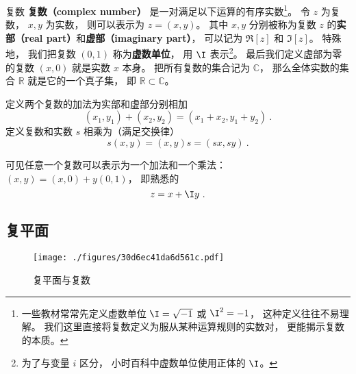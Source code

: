 


\begin{definition}{复数}
\textbf{复数（complex number）} 是一对满足以下运算的有序实数\footnote{一些教材常常先定义虚数单位 $\I = \sqrt{-1}$ 或 $\I^2 = -1$， 这种定义往往不易理解。 我们这里直接将复数定义为服从某种运算规则的实数对， 更能揭示复数的本质\cite{Rudin}。}。 令 $z$ 为复数， $x, y$ 为实数， 则可以表示为 $z = (x, y)$。 其中 $x,y$ 分别被称为复数 $z$ 的\textbf{实部（real part）}和\textbf{虚部（imaginary part）}， 可以记为 $\Re[z]$ 和 $\Im[z]$。 特殊地， 我们把复数 $(0, 1)$ 称为\textbf{虚数单位}， 用 $\I$ 表示\footnote{为了与变量 $i$ 区分， 小时百科中虚数单位使用正体的 $\I$。}。 最后我们定义虚部为零的复数 $(x, 0)$ 就是实数 $x$ 本身。 把所有复数的集合记为 $\mathbb C$， 那么全体实数的集合 $\mathbb R$ 就是它的一个真子集， 即 $\mathbb R \subset \mathbb C$。

定义两个复数的加法为实部和虚部分别相加
\begin{equation}\label{eq_CplxNo_1}
(x_1, y_1) + (x_2, y_2) = (x_1+ x_2, y_1 + y_2)~.
\end{equation}
定义复数和实数 $s$ 相乘为（满足交换律）
\begin{equation}\label{eq_CplxNo_4}
s(x, y) = (x, y)s = (sx, sy)~.
\end{equation}
\end{definition}
可见任意一个复数可以表示为一个加法和一个乘法： $(x, y) = (x, 0) + y(0, 1)$， 即熟悉的
\begin{equation}
z = x + \I y~.
\end{equation}

\subsection{复平面}
\begin{figure}[ht]
\centering
\texttt{[image: ./figures/30d6ec41da6d561c.pdf]}
\caption{复平面与复数} \label{fig_CplxNo_1}
\end{figure}

